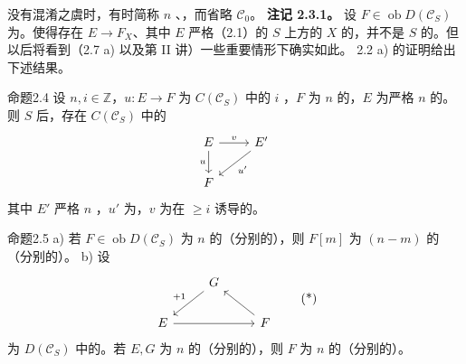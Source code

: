 没有混淆之虞时，有时简称 $n$ 、，而省略 $\mathscr C_0$。
\textbf{注记 2.3.1。} 设 $F\in\operatorname{ob}D(\mathscr C_S)$ 为。使得存在 $E\to F_X$、其中 $E$ 严格（2.1）的 $S$ 上方的 $X$ 的，并不是 $S$ 的。但以后将看到（2.7 a) 以及第 II 讲）一些重要情形下确实如此。
2.2 a) 的证明给出下述结果。
\begin{SGAresult}{命题}{2.4}
设 $n,i\in\mathbb Z$，$u:E\to F$ 为 $C(\mathscr C_S)$ 中的 $i$ ，$F$ 为 $n$ 的，$E$ 为严格 $n$ 的。则 $S$ 后，存在 $C(\mathscr C_S)$ 中的
\[\begin{tikzcd}E\arrow[r,"v"]\arrow[d,"u"']&E'\arrow[dl,"u'"]\\F&\end{tikzcd}\]
其中 $E'$ 严格 $n$ ，$u'$ 为，$v$ 为在 $\geq i$ 诱导的。
\end{SGAresult}
\begin{SGAresult}{命题}{2.5}
a) 若 $F\in\operatorname{ob}D(\mathscr C_S)$ 为 $n$ 的（分别的），则 $F[m]$ 为 $(n-m)$ 的（分别的）。
b) 设
\[\begin{tikzcd}&G\arrow[dl,"+1"']&\\E\arrow[rr]&&F\arrow[ul]\end{tikzcd}\tag{*}\]
为 $D(\mathscr C_S)$ 中的。若 $E,G$ 为 $n$ 的（分别的），则 $F$ 为 $n$ 的（分别的）。
\end{SGAresult}
